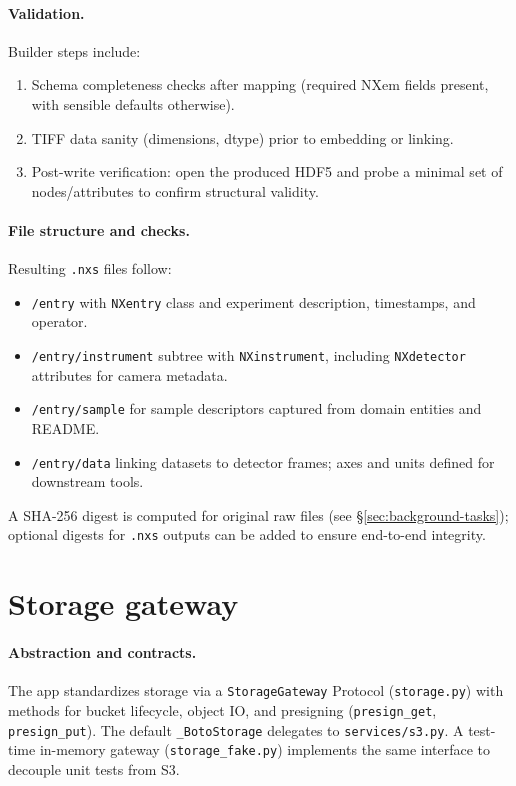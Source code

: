 \paragraph{Validation.}
Builder steps include:
\begin{enumerate}
	\item Schema completeness checks after mapping (required NXem fields present, with sensible defaults otherwise).
	\item TIFF data sanity (dimensions, dtype) prior to embedding or linking.
	\item Post-write verification: open the produced HDF5 and probe a minimal set of nodes/attributes to confirm structural validity.
\end{enumerate}

\paragraph{File structure and checks.}
Resulting \texttt{.nxs} files follow:
\begin{itemize}
	\item \texttt{/entry} with \texttt{NXentry} class and experiment description, timestamps, and operator.
	\item \texttt{/entry/instrument} subtree with \texttt{NXinstrument}, including \texttt{NXdetector} attributes for camera metadata.
	\item \texttt{/entry/sample} for sample descriptors captured from domain entities and README.
	\item \texttt{/entry/data} linking datasets to detector frames; axes and units defined for downstream tools.
\end{itemize}
A SHA-256 digest is computed for original raw files (see \S\ref{sec:background-tasks}); optional digests for \texttt{.nxs} outputs can be added to ensure end-to-end integrity.

\section{Storage gateway}\label{sec:storage-gateway}

\paragraph{Abstraction and contracts.}
The app standardizes storage via a \texttt{StorageGateway} Protocol (\texttt{storage.py}) with methods for bucket lifecycle, object IO, and presigning (\texttt{presign\_get}, \texttt{presign\_put}). The default \texttt{\_BotoStorage} delegates to \texttt{services/s3.py}. A test-time in-memory gateway (\texttt{storage\_fake.py}) implements the same interface to decouple unit tests from S3.

